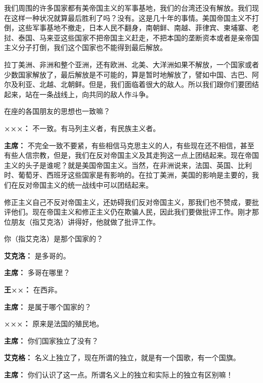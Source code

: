 \begin{list}{}
我们周围的许多国家都有美帝国主义的军事基地，我们的台湾还没有解放。我们现在这样一种状况就算最后胜利了吗？没有。这是几十年的事情。美国帝国主义不打倒，这些军事基地不撤走，日本人民不翻身，南朝鲜、南越、菲律宾、柬埔寨、老挝、泰国、马来亚这些国家不把帝国主义赶走，不把本国的垄断资本或者是亲帝国主义分子打倒，我们这个国家也不能得到最后解放。

拉丁美洲、非洲和整个亚洲，还有欧洲、北美、大洋洲如果不解放，一个国家或者少数国家解放了，最后解放是不可能的，算是暂时地解放了，譬如中国、古巴、阿尔及利亚、北越、北朝鲜。但是，我们面临着很大的敌人。所以我们跟你们要团结起来，站在一条战线上，向共同的敌人作斗争。

在座的各国朋友的思想也一致嘛？

\item[\textbf{×××：}] 不一致。有马列主义者，有民族主义者。

\item[\textbf{主席：}] 不完全一致不要紧，有些相信马克思主义的人，有些现在还不相信，甚至有些人信宗教，但是，我们在反对帝国主义及其走狗这一点上团结起来。现在帝国主义的头子是谁呢？就是美国帝国主义。当然，在非洲说来，法国、英国、比利时、葡萄牙、西班牙这些国家是有影响的。在拉丁美洲，美国的影响是主要的，我们在反对帝国主义的统一战线中可以团结起来。

修正主义自己不反对帝国主义，还妨碍我们反对帝国主义，那我们也不赞成，要批评他们。现在帝国主义和修正主义仍在欺骗人民，因此我们要做批评工作。刚才那位朋友（指艾克洛）讲得好，他就做了批评工作。

你（指艾克洛）是那个国家的？

\item[\textbf{艾克洛：}] 是多哥的。

\item[\textbf{主席：}] 多哥在哪里？

\item[\textbf{王××：}] 在西非。

\item[\textbf{主席：}] 是属于哪个国家的？

\item[\textbf{×××：}] 原来是法国的殖民地。

\item[\textbf{主席：}] 你们国家独立了没有？

\item[\textbf{艾克格：}] 名义上独立了，现在所谓的独立，就是有一个国歌，有一个国旗。

\item[\textbf{主席：}] 你们认识了这一点。所谓名义上的独立和实际上的独立有区别嘛！


\end{list}
